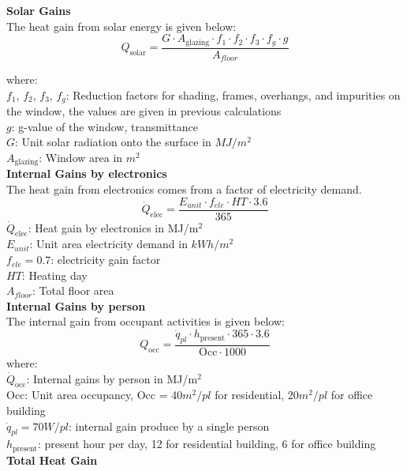 \documentclass[11pt, a4paper]{article}
\theoremstyle{definition}
\begin{document}
			\textbf{Solar Gains}\\
			The heat gain from solar energy is given below: \\
			\[Q_{\text{solar}} = \frac{G \cdot A_{\text{glazing}} \cdot f_1 \cdot f_2 \cdot f_3 \cdot f_g \cdot g}{A_{floor}} \]

			where:\\
			$f_1$, $f_2$, $f_3$, $f_g$: Reduction factors for shading, frames, overhangs, and impurities on the window, the values are given in previous calculations\\
			$g$: g-value of the window, transmittance\\
			$G$: Unit solar radiation onto the surface in $MJ/m^2$\\
			$A_{\text{glazing}}$: Window area in $m^2$\\

			
			\textbf{Internal Gains by electronics}\\
			The heat gain from electronics comes from a factor of electricity demand.
			\[\dot{Q}_{\text{elec}} = \frac{E_{unit}  \cdot f_{ele} \cdot HT \cdot 3.6}{365} \]
			$\dot{Q}_{\text{elec}}$: Heat gain by electronics in MJ/m$^2$\\
			$E_{unit}$: Unit area electricity demand in $kWh/m^2$\\
			$f_{ele} = 0.7$: electricity gain factor\\
			$HT$: Heating day\\
			$A_{floor}$: Total floor area\\


			\textbf{Internal Gains by person}\\
			The internal gain from occupant activities is given below:\\

			\[Q_{\text{occ}} = \frac{\dot{q}_{pl} \cdot h_{\text{present}} \cdot 365 \cdot 3.6}{\text{Occ} \cdot  1000}\]
			where:\\
			$\dot{Q}_{\text{occ}}$: Internal gains by person in MJ/m$^2$\\
			$\text{Occ}$: Unit area occupancy, Occ = 40$m^2/pl$ for residential, 20$m^2/pl$ for office building\\
			$\dot{q}_{pl} = 70W/pl$: internal gain produce by a single person\\
			$h_{\text{present}}$: present hour per day, 12 for residential building, 6 for office building\\



			\textbf{Total Heat Gain}
\end{document}
